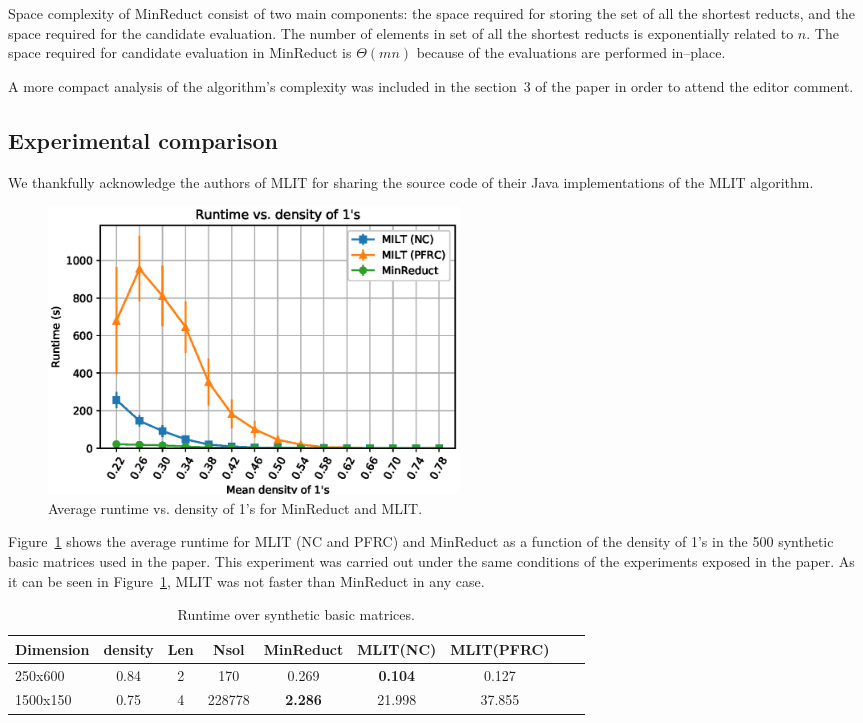 \documentclass[citenumber]{llncs}
\begin{document}
	Space complexity of MinReduct consist of two main components: the space required for storing the set of all the shortest reducts, and the space required for the candidate evaluation. The number of elements in set of all the shortest reducts is exponentially related to $n$. The space required for candidate evaluation in MinReduct is $\Theta(mn)$ because of the evaluations are performed in--place.
	
	A more compact analysis of the algorithm's complexity was included in the section~3 of the paper in order to attend the editor comment.
%
\subsection{Experimental comparison}\label{Comparison}
%	
	We thankfully acknowledge the authors of MLIT for sharing the source code of their Java implementations of the MLIT algorithm. 	
	
	\begin{figure}[hbt]
		\begin{center}
			\includegraphics[height=3in]{MinReduct_vs_milt.eps} 
		\end{center}
		\caption{Average runtime vs. density of 1’s for MinReduct and MLIT.}\label{fig:sinthyetic}
	\end{figure}  		
	
	Figure~\ref{fig:sinthyetic} shows the average runtime for MLIT (NC and PFRC) and MinReduct as a function of the density of 1’s in the 500 synthetic basic matrices used in the paper. This experiment was carried out under the same conditions of the experiments exposed in the paper. As it can be seen in Figure~\ref{fig:sinthyetic}, MLIT was not faster than MinReduct in any case. 			
	
	\begin{table}[htb]
		\small
		\caption{Runtime over synthetic basic matrices.}
		\centering
		\begin{tabular}{lcccccccc}\label{tab:comparison}
			Dimension & density & Len & Nsol & MinReduct & MLIT(NC) & MLIT(PFRC)\\
			\hline
			250x600  & 0.84 & 2 &   170  &      0.269     & \textbf{0.104} &  0.127 \\
			1500x150 & 0.75 & 4 & 228778 & \textbf{2.286} &     21.998     & 37.855 \\
		\end{tabular}             
	\end{table}  
	
\end{document}
